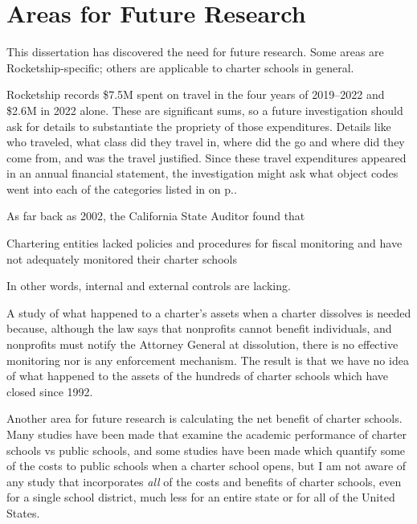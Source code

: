 \section{Areas for Future Research}%
\label{sec:areas-future-rese}\indent%

This dissertation has discovered the need for future research. Some areas are Rocketship-specific; others are applicable to charter schools in general.

Rocketship records \$7.5M spent on travel in the four years of 2019–2022 and \$2.6M in 2022 alone. These are significant sums, so a future investigation should ask for details to substantiate the propriety of those expenditures. Details like who traveled, what class did they travel in, where did the go and where did they come from, and was the travel justified. Since these travel expenditures appeared in an annual financial statement, the investigation might ask what object codes went into each of the categories listed in  on p.\pageref{tab:consolidated_functional_expenses}.

As far back as 2002, the California State Auditor found that
\begin{textquote}{Chartering entities lacked policies and procedures for fiscal monitoring and have not adequately monitored their charter schools}
\end{textquote}
In other words, internal and external controls are lacking.

A study of what happened to a charter's assets when a charter dissolves is needed because, although the law says that nonprofits cannot benefit individuals, and nonprofits must notify the Attorney General at dissolution, there is no effective monitoring nor is any enforcement mechanism. The result is that we have no idea of what happened to the assets of the hundreds of charter schools which have closed since 1992.

Another area for future research is calculating the net benefit of charter schools. Many studies have been made that examine the academic performance of charter schools vs public schools, and some studies have been made which quantify some of the costs to public schools when a charter school opens, but I am not aware of any study that incorporates \textit{all} of the costs and benefits of charter schools, even for a single school district, much less for an entire state or for all of the United States.

